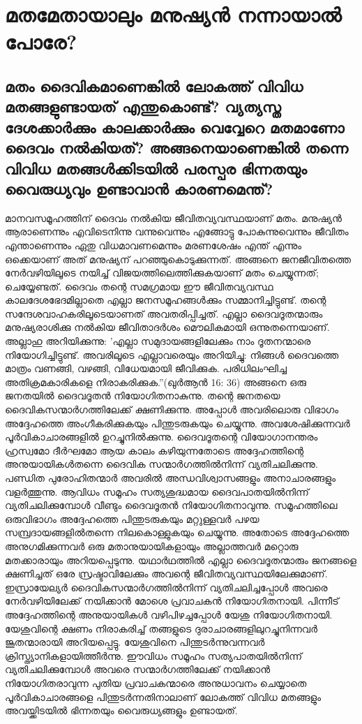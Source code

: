 \chapter{മതമേതായാലും മനുഷ്യന്‍ നന്നായാല്‍ പോരേ? }
 \section{ മതം ദൈവികമാണെങ്കില്‍ ലോകത്ത് വിവിധ മതങ്ങളുണ്ടായത് എന്തുകൊണ്ട്? വ്യത്യസ്ത ദേശക്കാര്‍ക്കും കാലക്കാര്‍ക്കും വെവ്വേറെ മതമാണോ ദൈവം നല്‍കിയത്? അങ്ങനെയാണെങ്കില്‍ തന്നെ വിവിധ മതങ്ങള്‍ക്കിടയില്‍ പരസ്പര ഭിന്നതയും വൈരുധ്യവും ഉണ്ടാവാന്‍ കാരണമെന്ത്?}
 

മാനവസമൂഹത്തിന് ദൈവം നല്‍കിയ ജീവിതവ്യവസ്ഥയാണ് മതം. മനുഷ്യന്‍ ആരാണെന്നും എവിടെനിന്നു വന്നുവെന്നും എങ്ങോട്ടു പോകുന്നുവെന്നും ജീവിതം എന്താണെന്നും ഏതു വിധമാവണമെന്നും മരണശേഷം എന്ത് എന്നും ഒക്കെയാണ് അത് മനുഷ്യന് പറഞ്ഞുകൊടുക്കുന്നത്. അങ്ങനെ ജനജീവിതത്തെ നേര്‍വഴിയിലൂടെ നയിച്ച് വിജയത്തിലെത്തിക്കുകയാണ് മതം ചെയ്യുന്നത്; ചെയ്യേണ്ടത്. ദൈവം തന്റെ സമഗ്രമായ ഈ ജീവിതവ്യവസ്ഥ കാലദേശഭേദമില്ലാതെ എല്ലാ ജനസമൂഹങ്ങള്‍ക്കും സമ്മാനിച്ചിട്ടുണ്ട്. തന്റെ സന്ദേശവാഹകരിലൂടെയാണത് അവതരിപ്പിച്ചത്. എല്ലാ ദൈവദൂതന്മാരും മനുഷ്യരാശിക്കു നല്‍കിയ ജീവിതാദര്‍ശം മൌലികമായി ഒന്നുതന്നെയാണ്. അല്ലാഹു അറിയിക്കുന്നു: 'എല്ലാ സമുദായങ്ങളിലേക്കും നാം ദൂതനന്മാരെ നിയോഗിച്ചിട്ടുണ്ട്. അവരിലൂടെ എല്ലാവരെയും അറിയിച്ചു: നിങ്ങള്‍ ദൈവത്തെ മാത്രം വണങ്ങി, വഴങ്ങി, വിധേയമായി ജീവിക്കുക. പരിധിലംഘിച്ച അതിക്രമകാരികളെ നിരാകരിക്കുക.''(ഖുര്‍ആന്‍ 16: 36)
അങ്ങനെ ഒരു ജനതയില്‍ ദൈവദൂതന്‍ നിയോഗിതനാകുന്നു. തന്റെ ജനതയെ ദൈവികസന്മാര്‍ഗത്തിലേക്ക് ക്ഷണിക്കുന്നു. അപ്പോള്‍ അവരിലൊരു വിഭാഗം അദ്ദേഹത്തെ അംഗീകരിക്കുകയും പിന്തുടരുകയും ചെയ്യുന്നു. അവശേഷിക്കുന്നവര്‍ പൂര്‍വികാചാരങ്ങളില്‍ ഉറച്ചുനില്‍ക്കുന്നു. ദൈവദൂതന്റെ വിയോഗാനന്തരം ഹ്രസ്വമോ ദീര്‍ഘമോ ആയ കാലം കഴിയുന്നതോടെ അദ്ദേഹത്തിന്റെ അനുയായികള്‍തന്നെ ദൈവിക സന്മാര്‍ഗത്തില്‍നിന്ന് വ്യതിചലിക്കുന്നു. പണ്ഡിത പുരോഹിതന്മാര്‍ അവരില്‍ അന്ധവിശ്വാസങ്ങളും അനാചാരങ്ങളും വളര്‍ത്തുന്നു. ആവിധം സമൂഹം സത്യശുദ്ധമായ ദൈവപാതയില്‍നിന്ന് വ്യതിചലിക്കുമ്പോള്‍ വീണ്ടും ദൈവദൂതന്‍ നിയോഗിതനാവുന്നു. സമൂഹത്തിലെ ഒരുവിഭാഗം അദ്ദേഹത്തെ പിന്തുടരുകയും മറ്റുള്ളവര്‍ പഴയ സമ്പ്രദായങ്ങളില്‍തന്നെ നിലകൊള്ളുകയും ചെയ്യുന്നു. അതോടെ അദ്ദേഹത്തെ അനുഗമിക്കുന്നവര്‍ ഒരു മതാനുയായികളായും അല്ലാത്തവര്‍ മറ്റൊരു മതക്കാരായും അറിയപ്പെടുന്നു. യഥാര്‍ഥത്തില്‍ എല്ലാ ദൈവദൂതന്മാരും ജനങ്ങളെ ക്ഷണിച്ചത് ഒരേ സ്രഷ്ടാവിലേക്കും അവന്റെ ജീവിതവ്യവസ്ഥയിലേക്കുമാണ്. ഇസ്രായേല്യര്‍ ദൈവികസന്മാര്‍ഗത്തില്‍നിന്ന് വ്യതിചലിച്ചപ്പോള്‍ അവരെ നേര്‍വഴിയിലേക്ക് നയിക്കാന്‍ മോശെ പ്രവാചകന്‍ നിയോഗിതനായി. പിന്നീട് അദ്ദേഹത്തിന്റെ അനുയായികള്‍ വഴിപിഴച്ചപ്പോള്‍ യേശു നിയോഗിതനായി. യേശുവിന്റെ ക്ഷണം നിരാകരിച്ച് തങ്ങളുടെ ദുരാചാരങ്ങളിലുറച്ചുനിന്നവര്‍ ജൂതന്മാരായി അറിയപ്പെട്ടു. യേശുവിനെ പിന്തുടര്‍ന്നുവന്നവര്‍ ക്രിസ്ത്യാനികളായിത്തീര്‍ന്നു. ഈവിധം സമൂഹം സത്യപാതയില്‍നിന്ന് വ്യതിചലിക്കുമ്പോള്‍ അവരെ സന്മാര്‍ഗത്തിലേക്ക് നയിക്കാന്‍ നിയോഗിതരാവുന്ന പുതിയ പ്രവാചകന്മാരെ അനുധാവനം ചെയ്യാതെ പൂര്‍വികാചാരങ്ങളെ പിന്തുടര്‍ന്നതിനാലാണ് ലോകത്ത് വിവിധ മതങ്ങളും അവയ്ക്കിടയില്‍ ഭിന്നതയും വൈരുധ്യങ്ങളും ഉണ്ടായത്.



